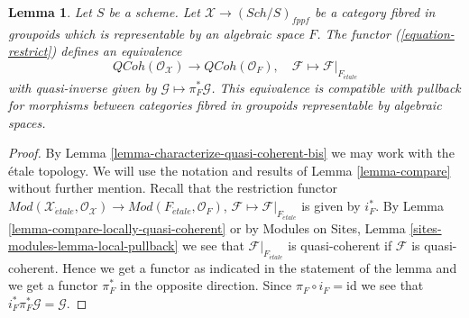 \documentclass{stacks-project}
\theoremstyle{plain}
\newtheorem{lemma}[subsection]{Lemma}
\theoremstyle{definition}
\theoremstyle{remark}
\numberwithin{equation}{subsection}
\def\Sch{\mathit{Sch}}
\def\etale{{\acute{e}tale}}
\def\QCoh{\mathit{QCoh}}
\begin{document}
\begin{lemma}
\label{lemma-compare-quasi-coherent}
Let $S$ be a scheme. Let $\mathcal{X} \to (\Sch/S)_{fppf}$ be a category
fibred in groupoids which is representable by an algebraic space $F$.
The functor (\ref{equation-restrict}) defines an equivalence
$$
\QCoh(\mathcal{O}_\mathcal{X}) \to \QCoh(\mathcal{O}_F),\quad
\mathcal{F} \longmapsto \mathcal{F}|_{F_\etale}
$$
with quasi-inverse given by $\mathcal{G} \mapsto \pi_F^*\mathcal{G}$.
This equivalence is compatible with pullback for morphisms between
categories fibred in groupoids representable by algebraic spaces.
\end{lemma}

\begin{proof}
By Lemma \ref{lemma-characterize-quasi-coherent-bis} we may work with
the \'etale topology. We will use the notation and results of
Lemma \ref{lemma-compare} without further mention.
Recall that the restriction functor
$\textit{Mod}(\mathcal{X}_\etale, \mathcal{O}_\mathcal{X}) \to
\textit{Mod}(F_\etale, \mathcal{O}_F)$,
$\mathcal{F} \mapsto \mathcal{F}|_{F_\etale}$ is given by $i_F^*$. By
Lemma \ref{lemma-compare-locally-quasi-coherent} or by
Modules on Sites, Lemma \ref{sites-modules-lemma-local-pullback}
we see that $\mathcal{F}|_{F_\etale}$ is quasi-coherent if
$\mathcal{F}$ is quasi-coherent.
Hence we get a functor as indicated in the statement of the
lemma and we get a functor $\pi_F^*$ in the opposite direction.
Since $\pi_F \circ i_F = \text{id}$ we see that
$i_F^*\pi_F^*\mathcal{G} = \mathcal{G}$.


\end{proof}
\end{document}
